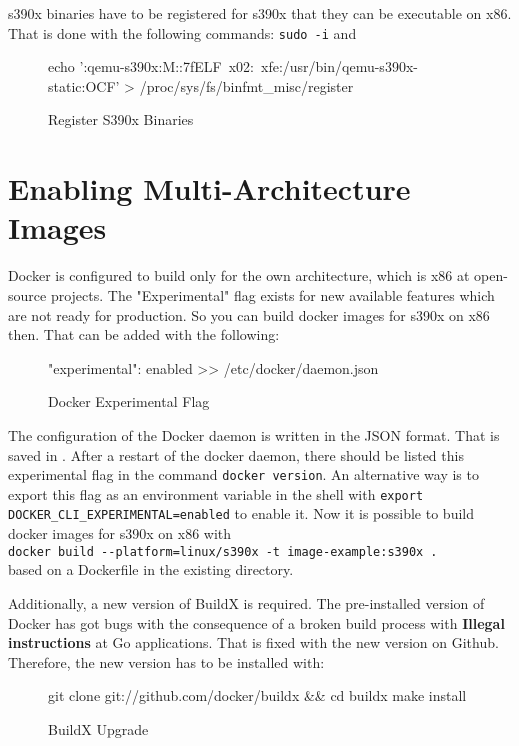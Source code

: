 s390x binaries have to be registered for s390x that they can be executable on x86. That is done with the following commands: \lstinline!sudo -i! and 
\begin{figure}[H]
\centering
\begin{boxedverbatim}
echo ':qemu-s390x:M::\x7fELF\
x02:\xff\xff\xff\xff\xff\xff\xff{}\xff\xff\xff\xff\xff\xff\xff\xff\xff\
xfe\xff\xff:/usr/bin/qemu-s390x-static:OCF' > /proc/sys/fs/binfmt_misc/register
\end{boxedverbatim}
 \caption{Register S390x Binaries}
    \label{RegisterS390xBinaries}
\end{figure}

\section{Enabling Multi-Architecture Images}\label{Multi-Architecture-Images}

Docker is configured to build only for the own architecture, which is x86 at open-source projects. The "Experimental" flag exists for new available features which are not ready for production. So you can build docker images for s390x on x86 then. That can be added with the following:

\begin{figure}[H]
\centering
\begin{boxedverbatim}
{
  "experimental": enabled
} >> /etc/docker/daemon.json
\end{boxedverbatim}
 \caption{Docker Experimental Flag}
    \label{DockerExperimentalFlag}
\end{figure}

The configuration of the Docker daemon is written in the JSON format. That is saved in .
After a restart of the docker daemon, there should be listed this experimental flag in the command  \lstinline!docker version!. An alternative way is to export this flag as an environment variable in the shell with  \lstinline!export DOCKER_CLI_EXPERIMENTAL=enabled! to enable it. Now it is possible to build docker images for s390x on x86 with \\ \lstinline!docker build --platform=linux/s390x -t image-example:s390x .! \\
based on a Dockerfile in the existing directory.

 
Additionally, a new version of BuildX is required. The pre-installed version of Docker has got bugs with the consequence of a broken build process with \textbf{Illegal instructions} at Go applications. That is fixed with the new version on Github. \\
Therefore, the new version has to be installed with:
\begin{figure}[H]
\centering
\begin{boxedverbatim}
git clone git://github.com/docker/buildx && cd buildx
make install
\end{boxedverbatim}
 \caption{BuildX Upgrade}
    \label{BuildXUpgrade}
\end{figure}
 

